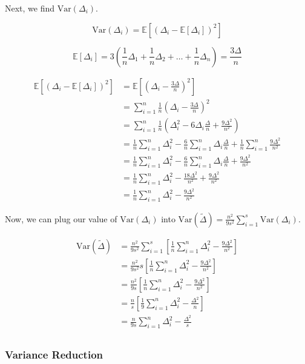 \documentclass[11pt]{article}
\begin{document}
Next, we find $\mathrm{Var}(\Delta_i)$.

\[
\mathrm{Var}(\Delta_i) = \mathbb{E}[(\Delta_i - \mathbb{E}[\Delta_i])^2]
\]

\[
\mathbb{E}[\Delta_i] = 3(\frac{1}{n} \Delta_1 + \frac{1}{n} \Delta_2 + \ldots + \frac{1}{n} \Delta_n) = \frac{3\Delta}{n}
\]

\[
\begin{aligned}
\mathbb{E}[(\Delta_i - \mathbb{E}[\Delta_i])^2] &= \mathbb{E}[(\Delta_i - \frac{3\Delta}{n})^2] \\
&= \sum_{i = 1}^{n} \frac{1}{n} (\Delta_i - \frac{3\Delta}{n})^2 \\
&= \sum_{i = 1}^{n} \frac{1}{n} (\Delta_i^2 - 6 \Delta_i \frac{\Delta}{n} + \frac{9\Delta^2}{n^2}) \\
&= \frac{1}{n} \sum_{i = 1}^{n} \Delta_i^2 - \frac{6}{n} \sum_{i = 1}^{n} \Delta_i \frac{\Delta}{n} + \frac{1}{n} \sum_{i = 1}^{n} \frac{9\Delta^2}{n^2} \\
&= \frac{1}{n} \sum_{i = 1}^{n} \Delta_i^2 - \frac{6}{n} \sum_{i = 1}^{n} \Delta_i \frac{\Delta}{n} + \frac{9\Delta^2}{n^2} \\
&= \frac{1}{n} \sum_{i = 1}^{n} \Delta_i^2 - \frac{18\Delta^2}{n^2} + \frac{9\Delta^2}{n^2} \\
&= \frac{1}{n} \sum_{i = 1}^{n} \Delta_i^2 - \frac{9\Delta^2}{n^2}
\end{aligned}
\]

Now, we can plug our value of $\mathrm{Var}(\Delta_i)$ into $\mathrm{Var}(\tilde{\Delta}) = \frac{n^2}{9s^2} \sum_{i=1}^{s} \mathrm{Var}(\Delta_i)$.

\[
\begin{aligned}
\mathrm{Var}(\tilde{\Delta}) &= \frac{n^2}{9s^2} \sum_{i=1}^{s} [\frac{1}{n} \sum_{i = 1}^{n} \Delta_i^2 - \frac{9\Delta^2}{n^2}] \\
&= \frac{n^2}{9s^2} s [\frac{1}{n} \sum_{i = 1}^{n} \Delta_i^2 - \frac{9\Delta^2}{n^2}] \\
&= \frac{n^2}{9s} [\frac{1}{n} \sum_{i = 1}^{n} \Delta_i^2 - \frac{9\Delta^2}{n^2}] \\
&= \frac{n}{s} [\frac{1}{9}\sum_{i = 1}^{n} \Delta_i^2 - \frac{\Delta^2}{n}] \\
&= \frac{n}{9s} \sum_{i = 1}^{n} \Delta_i^2 - \frac{\Delta^2}{s} \\
\end{aligned}
\]

\subsubsection{Variance Reduction}
\end{document}
